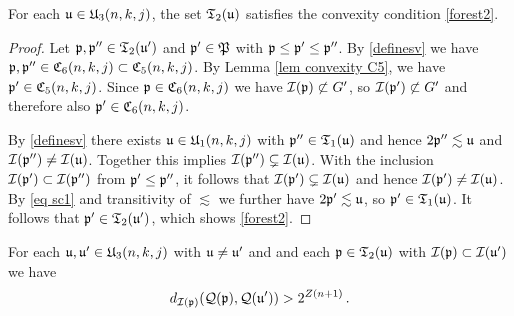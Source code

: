 \begin{lemma}
    \label{lem tree2 proof}
    For each $\mathfrak u\in \mathfrak U_3(n,k,j)$,
    the set $\mathfrak{T}_2(\mathfrak u)$
    satisfies the convexity condition \eqref{forest2}.
\end{lemma}

\begin{proof}
    Let $\mathfrak p, \mathfrak p'' \in \mathfrak{T}_2(\mathfrak u')$ and $\mathfrak p' \in \mathfrak P$ with $\mathfrak p \le \mathfrak p' \le \mathfrak p''$. By \eqref{definesv} we have $\mathfrak p, \mathfrak p'' \in \mathfrak C_6(n,k,j) \subset \mathfrak C_5(n,k,j)$. By Lemma \ref{lem convexity C5}, we have $\mathfrak p' \in \mathfrak C_5(n,k,j)$. Since $\mathfrak p \in \mathfrak C_6(n,k,j)$ we have $\mathcal{I}(\mathfrak p) \not \subset G'$, so $\mathcal{I}(\mathfrak p') \not \subset G'$ and therefore also $\mathfrak p' \in \mathfrak C_6(n,k,j)$.

    By \eqref{definesv} there exists $\mathfrak u \in \mathfrak U_1(n,k,j)$ with $\mathfrak p'' \in \mathfrak{T}_1(\mathfrak u)$ and hence $2\mathfrak p'' \lesssim \mathfrak u$ and $\mathcal{I}(\mathfrak p'') \ne \mathcal{I}(\mathfrak u)$. Together this implies $\mathcal{I}(\mathfrak p'') \subsetneq \mathcal{I}(\mathfrak u)$. With the inclusion $\mathcal{I}(\mathfrak p') \subset \mathcal{I}(\mathfrak p'')$ from $\mathfrak p' \le \mathfrak p''$, it follows that $\mathcal{I}(\mathfrak p') \subsetneq \mathcal{I}(\mathfrak u)$ and hence $\mathcal{I}(\mathfrak p') \ne \mathcal{I}(\mathfrak u)$.
    By \eqref{eq sc1} and transitivity of $\lesssim$ we further have $2\mathfrak p' \lesssim \mathfrak u$, so $\mathfrak p' \in \mathfrak{T}_1(\mathfrak u)$.
    It follows that $\mathfrak p' \in \mathfrak{T}_2(\mathfrak u')$, which shows \eqref{forest2}.
\end{proof}

\begin{lemma}
    \label{lem sep proof}
    For each $\mathfrak u,\mathfrak u'\in \mathfrak U_3(n,k,j)$ with $\mathfrak u\neq \mathfrak u'$ and
    and each $\mathfrak p \in \mathfrak T_2(\mathfrak u)$
    with $\mathcal{I}(\mathfrak p)\subset \mathcal{I}(\mathfrak u')$ we have
    \begin{equation}
    d_{\mathcal{I}(\mathfrak p)}(\mathcal{Q}(\mathfrak p), \mathcal{Q}(\mathfrak u')) > 2^{Z(n+1)}\,.
    \end{equation}
\end{lemma}

